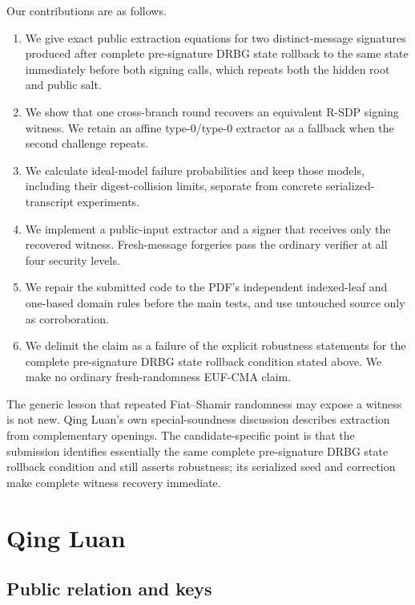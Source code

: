 \documentclass[11pt,a4paper]{article}
\begin{document}
Our contributions are as follows.
\begin{enumerate}[leftmargin=*,itemsep=2pt]
  \item We give exact public extraction equations for two distinct-message
        signatures produced after complete pre-signature DRBG state rollback
        to the same state immediately before both signing calls, which repeats
        both the hidden root and public salt.
  \item We show that one cross-branch round recovers an equivalent R-SDP
        signing witness.  We retain an affine type-0/type-0 extractor as a
        fallback when the second challenge repeats.
  \item We calculate ideal-model failure probabilities and keep those models,
        including their digest-collision limits, separate from concrete
        serialized-transcript experiments.
  \item We implement a public-input extractor and a signer that receives only
        the recovered witness.  Fresh-message forgeries pass the ordinary
        verifier at all four security levels.
  \item We repair the submitted code to the PDF's independent indexed-leaf and
        one-based domain rules before the main tests, and use untouched source
        only as corroboration.
  \item We delimit the claim as a failure of the explicit robustness
        statements for the complete pre-signature DRBG state rollback condition
        stated above.  We make no ordinary fresh-randomness EUF-CMA claim.
\end{enumerate}

The generic lesson that repeated Fiat--Shamir randomness may expose a witness
is not new.  Qing Luan's own special-soundness discussion describes extraction
from complementary openings.  The candidate-specific point is that the
submission identifies essentially the same complete pre-signature DRBG state
rollback condition and still asserts robustness; its serialized seed and
correction make complete witness recovery immediate.

\section{Qing Luan}

\subsection{Public relation and keys}
\end{document}
